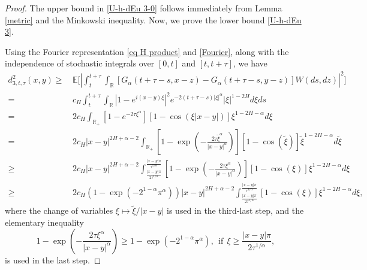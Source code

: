\documentclass[11pt,reqno]{amsart}
\numberwithin{equation}{section}
\def\RR{\mathbb{R}}
\newcommand{\1}{{\bf 1}}
\newcommand{\2}{{\bf 2}}
\newcommand{\lc}{\left(}
\newcommand{\rc}{\right)}
\newcommand{\lk}{\left[}
\newcommand{\rk}{\right]}
\newcommand{\lt}{\left }
\newcommand{\rt}{\right}
\begin{document}
 \begin{proof}
  The upper bound in  \eqref{U-h-dEu 3-0}   follows immediately from Lemma \ref{metric} and the Minkowski inequality. Now, we     prove  the lower bound  \eqref{U-h-dEu 3}.


Using the Fourier representation \eqref{eq H product} and \eqref{Fourier}, along with the independence of stochastic integrals over $[0,t]$ and $[t,t+\tau]$, we have
      \begin{equation}\label{eq-d3}
\begin{split}
d_{3, t,\tau}^2(x,y)
\ge&\, \mathbb{E} \Bigg[ \left| \int_{t}^{t+\tau}\int_{\mathbb{R}} \left[ G_{\alpha}(t+\tau - s,x - z) - G_{\alpha}(t+\tau - s,y - z) \right] W(ds,dz)\right|^2 \Bigg] \\
=&\,  c_{H}\int_t^{t+\tau}\int_{\RR}  \lt| 1-e^{i(x-y)\xi} \rt|^2   e^{-2(t+\tau-s)|\xi|^{\alpha}}    |\xi|^{1-2H} d\xi ds  \\
=&\, 2c_{H}\int_{\RR_+}\lk 1-e^{-2\tau\xi^{\alpha}}\rk\lk 1-\cos(\xi|x-y|)\rk \xi^{1-2H-\alpha}d\xi\\
=&\, 2c_{H}|x-y|^{2H+\alpha-2}\int_{\RR_+}\lk 1-\exp\lc-\frac{2\tau\tilde{\xi}^{\alpha}}{|x-y|^{\alpha}}\rc\rk
\lk 1-\cos(\tilde{\xi})\rk \tilde{\xi}^{1-2H-\alpha}d\tilde\xi\\
\ge &\, 2c_{H}|x-y|^{2H+\alpha-2} \int_{\frac{|x-y|\pi}{2\tau^{1/\alpha}}}^{\frac{|x-y|\pi}{\tau^{1/\alpha}}}\lk 1-\exp\lc-\frac{2\tau\xi^{\alpha}}{|x-y|^{\alpha}}\rc\rk
\lk 1-\cos(\xi)\rk \xi^{1-2H-\alpha}d\xi\\
\ge &\,   2  c_{H} \left(1- \exp\left(-2^{1-\alpha}\pi^{\alpha}\right)\right) |x-y|^{2H+\alpha-2} \int_{\frac{|x-y|\pi}{2\tau^{1/\alpha}}}^{\frac{|x-y|\pi}{\tau^{1/\alpha}}} \lk 1-\cos(\xi)\rk \xi^{1-2H-\alpha}d\xi,
 \end{split}
\end{equation}
 where the change of variables   $\xi \mapsto \tilde \xi/|x-y|$  is used in the  third-last step, and the elementary inequality
  \[
    1 - \exp\left(-\frac{2\tau\xi^\alpha}{|x-y|^\alpha}\right) \geq
    1- \exp\left(-2^{1-\alpha}\pi^{\alpha}\right),\ \ \text{if}\ \ \xi\geq \frac{|x-y|\pi}{2\tau^{1/\alpha}},
    \]
is used   in the last step.



\end{proof}
\end{document}
